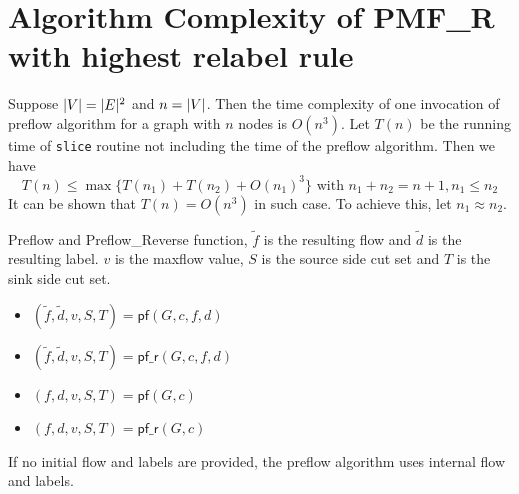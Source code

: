 \documentclass{article}
\begin{document}
\section{Algorithm Complexity of PMF\_R with highest relabel rule}
Suppose $\lvert V\rvert=\lvert E\rvert^2$ and $n=\lvert V\rvert$. Then the time complexity of one invocation of preflow algorithm for a graph with $n$ nodes is $O(n^3)$. Let $T(n)$ be the running time of \texttt{slice} routine not including the time of the preflow algorithm.
Then we have
\begin{equation}
T(n) \leq \max\{T(n_1) + T(n_2) + O(n_1)^3\} \textrm{ with } n_1 + n_2 = n+1, n_1 \leq n_2
\end{equation}
It can be shown that $T(n) = O(n^3)$ in such case. To achieve this,  let $n_1 \approx n_2$.


Preflow and Preflow\_Reverse function, $\tilde{f}$ is the resulting flow and $\tilde{d}$ is the resulting label. $v$ is the maxflow value, $S$ is the source side cut set and $T$ is the sink side cut set.
\begin{itemize}
\item $(\tilde{f}, \tilde{d}, v, S, T) = \textsf{pf}(G, c, f, d)$
\item $(\tilde{f}, \tilde{d}, v, S, T) = \textsf{pf\_r}(G, c, f, d)$
\item $(f, d, v, S, T) = \textsf{pf}(G, c)$
\item $(f, d, v, S, T) = \textsf{pf\_r}(G, c)$
\end{itemize}	
If no initial flow and labels are provided, the preflow algorithm uses internal flow and labels.
\end{document}
